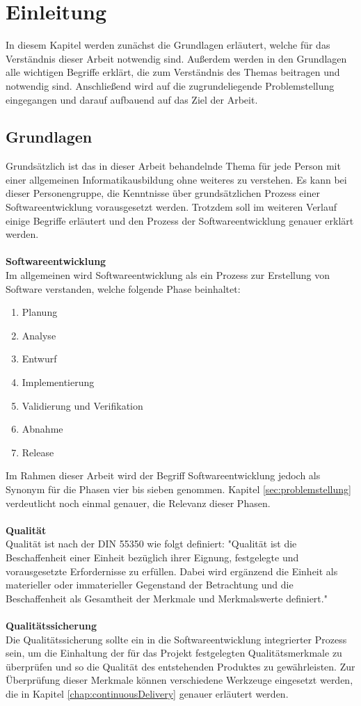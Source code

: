 \chapter{Einleitung}
\label{chap:einleitung}
In diesem Kapitel werden zunächst die Grundlagen erläutert, welche für das Verständnis dieser Arbeit notwendig sind. Außerdem werden in den Grundlagen alle wichtigen Begriffe erklärt, die zum Verständnis des Themas beitragen und notwendig sind. Anschließend wird auf die zugrundeliegende Problemstellung eingegangen und darauf aufbauend auf das Ziel der Arbeit.

\section{Grundlagen}
\label{sec:grundlagen}
Grundsätzlich ist das in dieser Arbeit behandelnde Thema für jede Person mit einer allgemeinen Informatikausbildung ohne weiteres zu verstehen. Es kann bei dieser Personengruppe, die Kenntnisse über grundsätzlichen Prozess einer Softwareentwicklung vorausgesetzt werden. Trotzdem soll im weiteren Verlauf einige Begriffe erläutert und den Prozess der Softwareentwicklung genauer erklärt werden.
\\\\
\textbf{Softwareentwicklung}\\
Im allgemeinen wird Softwareentwicklung als ein Prozess zur Erstellung von Software verstanden, welche folgende Phase beinhaltet:
\begin{enumerate}
	\item Planung
	\item Analyse
	\item Entwurf
	\item Implementierung
	\item Validierung und Verifikation
	\item Abnahme
	\item Release
\end{enumerate}
Im Rahmen dieser Arbeit wird der Begriff Softwareentwicklung jedoch als Synonym für die Phasen vier bis sieben genommen. Kapitel \ref{sec:problemstellung}  verdeutlicht noch einmal genauer, die Relevanz dieser Phasen.
\\\\
\textbf{Qualität}\\
Qualität ist nach der DIN 55350 wie folgt definiert: "Qualität ist die Beschaffenheit einer Einheit bezüglich ihrer Eignung, festgelegte und vorausgesetzte Erfordernisse zu erfüllen. Dabei wird ergänzend die Einheit als materieller oder immaterieller Gegenstand der Betrachtung und die Beschaffenheit als Gesamtheit der Merkmale und Merkmalswerte definiert."
\\\\
\textbf{Qualitätssicherung}\\
Die Qualitätssicherung sollte ein in die Softwareentwicklung integrierter Prozess sein, um die Einhaltung der für das Projekt festgelegten Qualitätsmerkmale zu überprüfen und so die Qualität des entstehenden Produktes zu gewährleisten. Zur Überprüfung dieser Merkmale können verschiedene Werkzeuge eingesetzt werden, die in Kapitel \ref{chap:continuousDelivery}  genauer erläutert werden.

